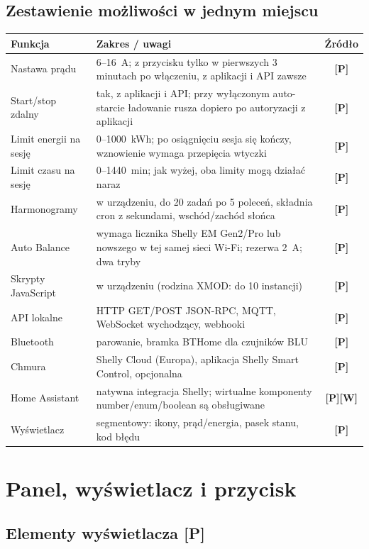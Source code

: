 \documentclass[11pt,a4paper]{article}
\newcommand{\tagP}{\textcolor{apgreen}{\textbf{[P]}}}
\newcommand{\tagW}{\textcolor{apamber}{\textbf{[W]}}}
\begin{document}
\subsection{Zestawienie możliwości w jednym miejscu}

\begin{tabularx}{\textwidth}{p{5.2cm}Xc}
\toprule
\textbf{Funkcja} & \textbf{Zakres / uwagi} & \textbf{Źródło} \\
\midrule
Nastawa prądu & 6–16~A; z przycisku tylko w pierwszych 3 minutach po włączeniu, z aplikacji i API zawsze & \tagP \\
Start/stop zdalny & tak, z aplikacji i API; przy wyłączonym auto-starcie ładowanie rusza dopiero po autoryzacji z aplikacji & \tagP \\
Limit energii na sesję & 0–1000~kWh; po osiągnięciu sesja się kończy, wznowienie wymaga przepięcia wtyczki & \tagP \\
Limit czasu na sesję & 0–1440~min; jak wyżej, oba limity mogą działać naraz & \tagP \\
Harmonogramy & w urządzeniu, do 20 zadań po 5 poleceń, składnia cron z sekundami, wschód/zachód słońca & \tagP \\
Auto Balance & wymaga licznika Shelly EM Gen2/Pro lub nowszego w tej samej sieci Wi-Fi; rezerwa 2~A; dwa tryby & \tagP \\
Skrypty JavaScript & w urządzeniu (rodzina XMOD: do 10 instancji) & \tagP \\
API lokalne & HTTP GET/POST JSON-RPC, MQTT, WebSocket wychodzący, webhooki & \tagP \\
Bluetooth & parowanie, bramka BTHome dla czujników BLU & \tagP \\
Chmura & Shelly Cloud (Europa), aplikacja Shelly Smart Control, opcjonalna & \tagP \\
Home Assistant & natywna integracja Shelly; wirtualne komponenty number/enum/boolean są obsługiwane & \tagP \tagW \\
Wyświetlacz & segmentowy: ikony, prąd/energia, pasek stanu, kod błędu & \tagP \\
\bottomrule
\end{tabularx}

\section{Panel, wyświetlacz i przycisk}

\subsection{Elementy wyświetlacza \tagP}
\end{document}
